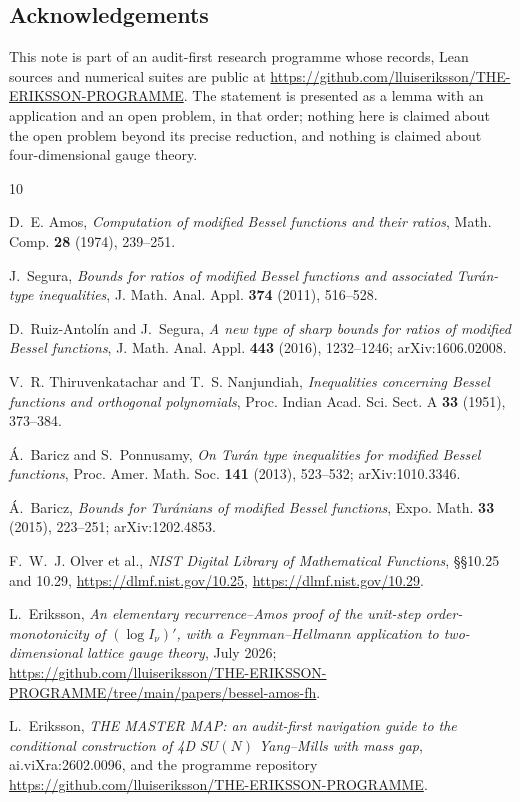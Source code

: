 \documentclass[11pt]{article}
\theoremstyle{remark}
\begin{document}
\subsection*{Acknowledgements}
This note is part of an audit-first research programme whose records,
Lean sources and numerical suites are public at
\url{https://github.com/lluiseriksson/THE-ERIKSSON-PROGRAMME}. The
statement is presented as a lemma with an application and an open
problem, in that order; nothing here is claimed about the open
problem beyond its precise reduction, and nothing is claimed about
four-dimensional gauge theory.

\begin{thebibliography}{10}\small

D.~E. Amos,
\emph{Computation of modified Bessel functions and their ratios},
Math. Comp. \textbf{28} (1974), 239--251.

J.~Segura,
\emph{Bounds for ratios of modified Bessel functions and associated
Tur\'an-type inequalities},
J. Math. Anal. Appl. \textbf{374} (2011), 516--528.

D.~Ruiz-Antol\'in and J.~Segura,
\emph{A new type of sharp bounds for ratios of modified Bessel
functions},
J. Math. Anal. Appl. \textbf{443} (2016), 1232--1246;
arXiv:1606.02008.

V.~R. Thiruvenkatachar and T.~S. Nanjundiah,
\emph{Inequalities concerning Bessel functions and orthogonal
polynomials},
Proc. Indian Acad. Sci. Sect. A \textbf{33} (1951), 373--384.

\'A.~Baricz and S.~Ponnusamy,
\emph{On Tur\'an type inequalities for modified Bessel functions},
Proc. Amer. Math. Soc. \textbf{141} (2013), 523--532;
arXiv:1010.3346.

\'A.~Baricz,
\emph{Bounds for Tur\'anians of modified Bessel functions},
Expo. Math. \textbf{33} (2015), 223--251; arXiv:1202.4853.

F.~W.~J. Olver et al.,
\emph{NIST Digital Library of Mathematical Functions},
\S\S10.25 and 10.29, \url{https://dlmf.nist.gov/10.25},
\url{https://dlmf.nist.gov/10.29}.

L.~Eriksson,
\emph{An elementary recurrence--Amos proof of the unit-step
order-monotonicity of $(\log I_\nu)'$, with a Feynman--Hellmann
application to two-dimensional lattice gauge theory},
July 2026;
\url{https://github.com/lluiseriksson/THE-ERIKSSON-PROGRAMME/tree/main/papers/bessel-amos-fh}.

L.~Eriksson,
\emph{THE MASTER MAP: an audit-first navigation guide to the
conditional construction of 4D $SU(N)$ Yang--Mills with mass gap},
ai.viXra:2602.0096, and the programme repository
\url{https://github.com/lluiseriksson/THE-ERIKSSON-PROGRAMME}.

\end{thebibliography}
\end{document}
